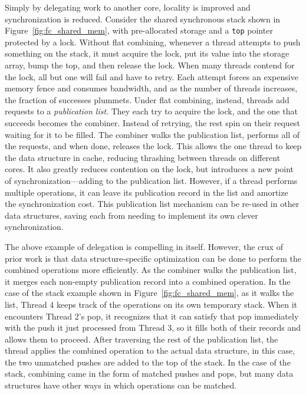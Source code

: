

Simply by delegating work to another core, locality is improved and synchronization is reduced.
Consider the shared synchronous stack shown in Figure~\ref{fig:fc_shared_mem}, with pre-allocated storage and a \texttt{top} pointer protected by a lock. Without flat combining, whenever a thread attempts to push something on the stack, it must acquire the lock, put its value into the storage array, bump the top, and then release the lock. When many threads contend for the lock, all but one will fail and have to retry. Each attempt forces an expensive memory fence and consumes bandwidth, and as the number of threads increases, the fraction of successes plummets. Under flat combining, instead, threads add requests to a \emph{publication list}. They each try to acquire the lock, and the one that succeeds becomes the combiner. Instead of retrying, the rest spin on their request waiting for it to be filled. The combiner walks the publication list, performs all of the requests, and when done, releases the lock. This allows the one thread to keep the data structure in cache, reducing thrashing between threads on different cores. It also greatly reduces contention on the lock, but introduces a new point of synchronization---adding to the publication list. However, if a thread performs multiple operations, it can leave its publication record in the list and amortize the synchronization cost. This publication list mechanism can be re-used in other data structures, saving each from needing to implement its own clever synchronization.

The above example of delegation is compelling in itself. However, the crux of prior work is that data structure-specific optimization can be done to perform the combined operations more efficiently.
As the combiner walks the publication list, it merges each non-empty publication record into a combined operation. In the case of the stack example shown in Figure~\ref{fig:fc_shared_mem}, as it walks the list, Thread 4 keeps track of the operations on its own temporary stack. When it encounters Thread 2's pop, it recognizes that it can satisfy that pop immediately with the push it just processed from Thread 3, so it fills both of their records and allows them to proceed. After traversing the rest of the publication list, the thread applies the combined operation to the actual data structure, in this case, the two unmatched pushes are added to the top of the stack.
In the case of the stack, combining came in the form of matched pushes and pops, but many data structures have other ways in which operations can be matched.

